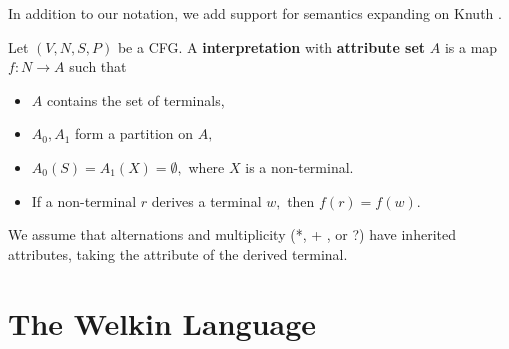 In addition to our notation, we add support for semantics expanding on Knuth \cite{knuth-attribute-grammars}.

\begin{definition}
  Let $(V, N, S, P)$ be a CFG. A \textbf{interpretation} with \textbf{attribute set} $A$ is a map $f: N \to A$ such that
  \begin{itemize}
    \item $A$ contains the set of terminals,
    \item $A_{0}, A_{1}$ form a partition on $A,$
    \item $A_{0}(S) = A_{1}(X) = \emptyset,$ where $X$ is a non-terminal.
    \item If a non-terminal $r$ derives a terminal $w,$ then $f(r) = f(w).$
  \end{itemize}


We assume that  alternations and multiplicity (*, + , or ?) have inherited attributes, taking the attribute of the derived terminal.

\end{definition}


\section{The Welkin Language}

